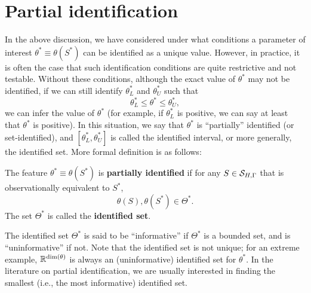 \documentclass[11pt, A4paper, openany, uplatex]{book}
\begin{document}
\section{Partial identification}
In the above discussion, we have considered under what conditions a parameter of interest $\theta^* \equiv \theta(S^*)$ can be identified as a unique value.
However, in practice, it is often the case that such identification conditions are quite restrictive and not testable.
Without these conditions, although the exact value of $\theta^*$ may not be identified, if we can still identify $\theta^*_L$ and $\theta^*_U$ such that
\[
	\theta^*_L \le \theta^* \le \theta^*_U,
\]
we can infer the value of $\theta^*$ (for example, if $\theta^*_L$ is positive, we can say at least that $\theta^*$ is positive).
In this situation, we say that $\theta^*$ is ``partially'' identified (or set-identified), and $[\theta^*_L, \theta^*_U]$ is called the identified interval, or more generally, the identified set.
More formal definition is as follows:
\begin{definition}
	 The feature $\theta^* \equiv \theta(S^*)$ is \textbf{partially identified} if for any $S \in \mathcal{S}_{H,\Gamma}$ that is observationally equivalent to $S^*$,
	\[
	\theta(S), \theta(S^*) \in \Theta^*.
	\]
	The set $\Theta^*$ is called the \textbf{identified set}.
\end{definition}
The identified set $\Theta^*$ is said to be ``informative'' if $\Theta^*$ is a bounded set, and is ``uninformative'' if not.
Note that the identified set is not unique; for an extreme example, $\mathbb{R}^{\text{dim}(\theta)}$ is always an (uninformative) identified set for $\theta^*$.
In the literature on partial identification, we are usually interested in finding the smallest (i.e., the most informative) identified set.
\end{document}

